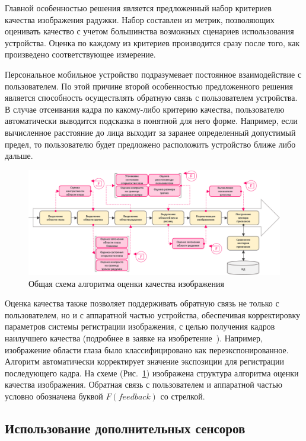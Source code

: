 Главной особенностью решения является предложенный набор критериев качества изображения радужки. Набор составлен из метрик, позволяющих оценивать качество с учетом большинства возможных сценариев использования устройства. Оценка по каждому из критериев производится сразу после того, как произведено соответствующее измерение.

Персональное мобильное устройство подразумевает постоянное взаимодействие с пользователем. По этой причине второй особенностью предложенного решения является способность осуществлять обратную связь с пользователем устройства. В случае отсеивания кадра по какому-либо критерию качества, пользователю автоматически выводится подсказка в понятной для него форме. Например, если вычисленное расстояние до лица выходит за заранее определенный допустимый предел, то пользователю будет предложено расположить устройство ближе либо дальше.

\begin{figure}[t!]
	\centering
	\includegraphics[width=0.95\columnwidth]{pictures/qa_structure.png}
	\caption{Общая схема алгоритма оценки качества изображения}
	\label{fig:qa_structure}
\end{figure}

Оценка качества также позволяет поддерживать обратную связь не только с пользователем, но и с аппаратной частью устройства, обеспечивая корректировку параметров системы регистрации изображения, с целью получения кадров наилучшего качества (подробнее в заявке на изобретение~\cite{gnatyuk_patent_2018}). Например, изображение области глаза было классифицировано как переэкспонированное. Алгоритм автоматически корректирует значение экспозиции для регистрации последующего кадра. На схеме (Рис.~\ref{fig:qa_structure}) изображена структура алгоритма оценки качества изображения. Обратная связь с пользователем и аппаратной частью условно обозначена буквой $F (feedback)$ со стрелкой.

\subsection{Использование дополнительных сенсоров}
\label{subsec:sensor_usage}

